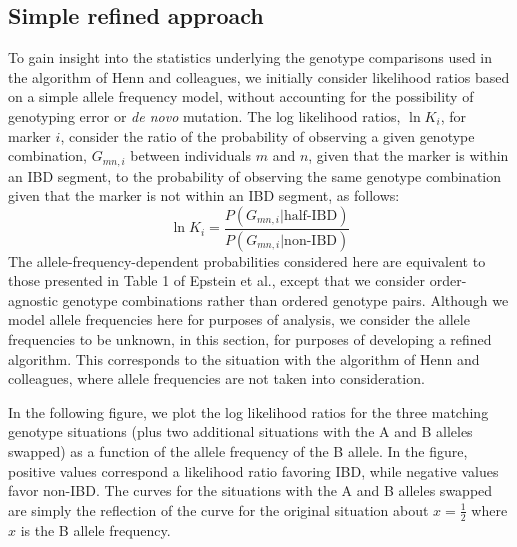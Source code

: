 \documentclass{article}
\begin{document}
\subsection{Simple refined approach}
To gain insight into the statistics underlying the genotype comparisons used in the algorithm of Henn and colleagues, we initially consider likelihood ratios based on a simple allele frequency model, without accounting for the possibility of genotyping error or \textit{de novo} mutation. The log likelihood ratios, $\ln K_i$, for marker $i$, consider the ratio of the probability of observing a given genotype combination, $G_{mn,i}$ between individuals $m$ and $n$, given that the marker is within an IBD segment, to the probability of observing the same genotype combination given that the marker is not within an IBD segment, as follows:
\begin{equation}
  \ln K_i = \frac{P(G_{mn,i} | \text{half-IBD})}{P(G_{mn,i} | \text{non-IBD})}
\end{equation}
The allele-frequency-dependent probabilities considered here are equivalent to those presented in Table 1 of Epstein et al.,\citep{RELPAIR} except that we consider order-agnostic genotype combinations rather than ordered genotype pairs. Although we model allele frequencies here for purposes of analysis, we consider the allele frequencies to be unknown, in this section, for purposes of developing a refined algorithm. This corresponds to the situation with the algorithm of Henn and colleagues, where allele frequencies are not taken into consideration.

In the following figure, we plot the log likelihood ratios for the three matching genotype situations (plus two additional situations with the A and B alleles swapped) as a function of the allele frequency of the B allele. In the figure, positive values correspond a likelihood ratio favoring IBD, while negative values favor non-IBD. The curves for the situations with the A and B alleles swapped are simply the reflection of the curve for the original situation about $x=\frac{1}{2}$ where $x$ is the B allele frequency.
\end{document}
